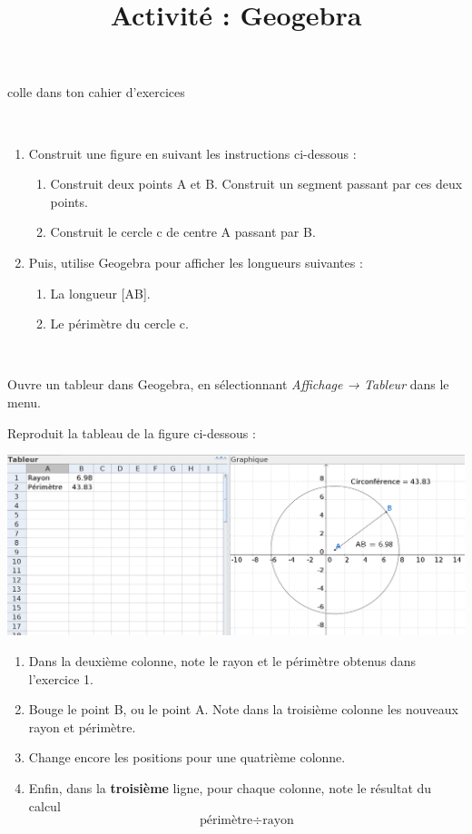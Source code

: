 \documentclass[a4paper,11pt]{article}
\title{Activité : Geogebra}
\date{}
\author{}
\makeatletter
\renewcommand{\maketitle}{%
{\scriptsize colle dans ton cahier d'exercices} \vspace{0.5em}

	\begin{center}
		\LARGE
		\myuline{\@title}
		\vspace{1em}
	\end{center}
}
\makeatother
\begin{document}
\maketitle

\begin{exercice}\
	\begin{enumerate}
		\item Construit une figure en suivant les instructions ci-dessous :
		      \begin{enumerate}
			      \item Construit deux points A et B. Construit un segment passant par ces deux points.
			      \item Construit le cercle c de centre A passant par B.
		      \end{enumerate}
		\item Puis, utilise Geogebra pour afficher les longueurs suivantes :
		      \begin{enumerate}
			      \item La longueur [AB].
			      \item Le périmètre du cercle c.
		      \end{enumerate}
	\end{enumerate}
\end{exercice}

\begin{exercice}\

	Ouvre un tableur dans Geogebra, en sélectionnant \textit{Affichage → Tableur} dans le menu.

	Reproduit la tableau de la figure ci-dessous :

	\begin{center}
		\includegraphics[width=0.85\linewidth]{Images/Activité - Geogebra - figure.png}
	\end{center}

	\begin{enumerate}
		\item Dans la deuxième colonne, note le rayon et le périmètre obtenus dans l'exercice 1.
		\item Bouge le point B, ou le point A. Note dans la troisième colonne les nouveaux rayon et périmètre.
		\item Change encore les positions pour une quatrième colonne.
		\item Enfin, dans la \textbf{troisième} ligne, pour chaque colonne, note le résultat du calcul
		      $$ \text{périmètre} ÷ \text{rayon} $$
	\end{enumerate}
\end{exercice}
\end{document}
